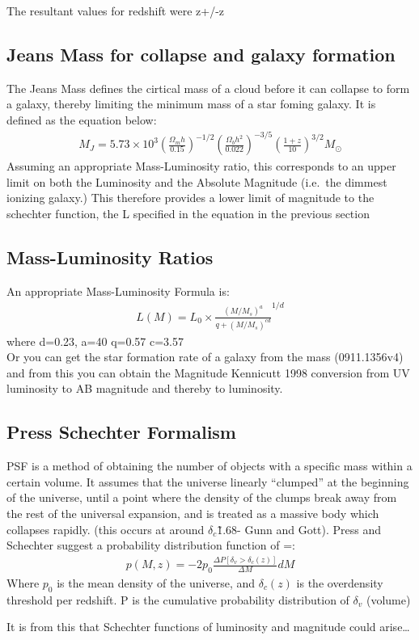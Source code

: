 	The resultant values for redshift were z+/-z

\subsection{Jeans Mass for collapse and galaxy formation}

	The Jeans Mass defines the cirtical mass of a cloud before it can collapse to form a galaxy, thereby limiting the minimum mass of a star foming galaxy. It is defined as the equation below:
	\begin{align}
	M_J = 5.73\times 10^3{\left(\frac{\Omega_mh}{0.15} \right)}^{-1/2} {\left( \frac{\Omega_b h^2}{0.022}\right)}^{-3/5} {\left( \frac {1+z}{10} \right)}^{3/2} M_\odot
	\end{align}
	Assuming an appropriate Mass-Luminosity ratio, this corresponds to an upper limit on both the Luminosity and the Absolute Magnitude (i.e.\ the dimmest ionizing galaxy.) This therefore provides a lower limit of magnitude to the schechter function, the L specified in the equation in the previous section

	\subsection{Mass-Luminosity Ratios}

	An appropriate Mass-Luminosity Formula is:
	\begin{align}
	L(M) = L_0 \times \frac {{(M/M_s)}^a} {q+{(M/M_s)}^{cd}}^{1/d}
	\end{align}
	where d=0.23, a=40 q=0.57 c=3.57\\
	\newline
	Or you can get the star formation rate of a galaxy from the mass (0911.1356v4) and from this you can obtain the Magnitude Kennicutt 1998 conversion from UV luminosity to AB magnitude and thereby to luminosity.

\subsection{Press Schechter Formalism}

	PSF is a method of obtaining the number of objects with a specific mass within a certain volume. It assumes that the universe linearly ``clumped'' at the beginning of the universe, until a point where the density of the clumps break away from the rest of the universal expansion, and is treated as a massive body which collapses rapidly. (this occurs at around $\delta_c$\~1.68- Gunn and Gott). Press and Schechter suggest a probability distribution function of =:
	\begin{align}
	p(M,z)=-2p_0 \frac{\Delta P [\delta_v>\delta_c(z)]} {\Delta M} dM
	\end{align}
	Where $p_0$ is the mean density of the universe, and $\delta_c(z)$ is the overdensity threshold per redshift. P is the cumulative probability distribution of $\delta_v$ (volume)

	 It is from this that Schechter functions of luminosity and magnitude could arise\ldots
